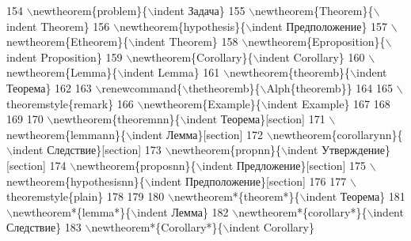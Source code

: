 \begin{DoxyCode}
{}
154 \textcolor{stringliteral}{\(\backslash\)newtheorem\{problem\}\{\(\backslash\)indent Задача\}
}
155 \textcolor{stringliteral}{\(\backslash\)newtheorem\{Theorem\}\{\(\backslash\)indent Theorem\}
}
156 \textcolor{stringliteral}{\(\backslash\)newtheorem\{hypothesis\}\{\(\backslash\)indent Предположение\}
}
157 \textcolor{stringliteral}{\(\backslash\)newtheorem\{Etheorem\}\{\(\backslash\)indent Theorem\}
}
158 \textcolor{stringliteral}{\(\backslash\)newtheorem\{Eproposition\}\{\(\backslash\)indent Proposition\}
}
159 \textcolor{stringliteral}{\(\backslash\)newtheorem\{Corollary\}\{\(\backslash\)indent Corollary\}
}
160 \textcolor{stringliteral}{\(\backslash\)newtheorem\{Lemma\}\{\(\backslash\)indent Lemma\}
}
161 \textcolor{stringliteral}{\(\backslash\)newtheorem\{theoremb\}\{\(\backslash\)indent Теорема\}
}
162 \textcolor{stringliteral}{%
}
163 \textcolor{stringliteral}{\(\backslash\)renewcommand\{\(\backslash\)thetheoremb\}\{\(\backslash\)Alph\{theoremb\}\}
}
164 \textcolor{stringliteral}{}
165 \textcolor{stringliteral}{\(\backslash\)theoremstyle\{remark\}
}
166 \textcolor{stringliteral}{\(\backslash\)newtheorem\{Example\}\{\(\backslash\)indent Example\}
}
167 \textcolor{stringliteral}{}
168 \textcolor{stringliteral}{}
169 \textcolor{stringliteral}{%
}
170 \textcolor{stringliteral}{\(\backslash\)newtheorem\{theoremnn\}\{\(\backslash\)indent Теорема\}[section]
}
171 \textcolor{stringliteral}{\(\backslash\)newtheorem\{lemmann\}\{\(\backslash\)indent Лемма\}[section]
}
172 \textcolor{stringliteral}{\(\backslash\)newtheorem\{corollarynn\}\{\(\backslash\)indent Следствие\}[section]
}
173 \textcolor{stringliteral}{\(\backslash\)newtheorem\{propnn\}\{\(\backslash\)indent Утверждение\}[section]
}
174 \textcolor{stringliteral}{\(\backslash\)newtheorem\{proposnn\}\{\(\backslash\)indent Предложение\}[section]
}
175 \textcolor{stringliteral}{\(\backslash\)newtheorem\{hypothesisnn\}\{\(\backslash\)indent Предположение\}[section]
}
176 \textcolor{stringliteral}{}
177 \textcolor{stringliteral}{\(\backslash\)theoremstyle\{plain\}
}
178 \textcolor{stringliteral}{%
}
179 \textcolor{stringliteral}{%
}
180 \textcolor{stringliteral}{\(\backslash\)newtheorem*\{theorem*\}\{\(\backslash\)indent Теорема\}
}
181 \textcolor{stringliteral}{\(\backslash\)newtheorem*\{lemma*\}\{\(\backslash\)indent Лемма\}
}
182 \textcolor{stringliteral}{\(\backslash\)newtheorem*\{corollary*\}\{\(\backslash\)indent Следствие\}
}
183 \textcolor{stringliteral}{\(\backslash\)newtheorem*\{Corollary*\}\{\(\backslash\)indent Corollary\}
}
\end{DoxyCode}
